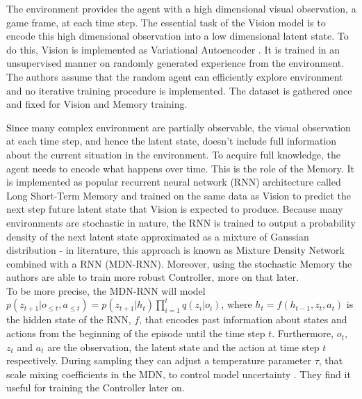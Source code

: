 The environment provides the agent with a high dimensional visual observation, a game frame, at each time step. The essential task of the Vision model is to encode this high dimensional observation into a low dimensional latent state. To do this, Vision is implemented as Variational Autoencoder \cite{Algo.VAE}. It is trained in an unsupervised manner on randomly generated experience from the environment. The authors assume that the random agent can efficiently explore environment and no iterative training procedure is implemented. The dataset is gathered once and fixed for Vision and Memory training.

Since many complex environment are partially observable, the visual observation at each time step, and hence the latent state, doesn't include full information about the current situation in the environment. To acquire full knowledge, the agent needs to encode what happens over time. This is the role of the Memory. It is implemented as popular recurrent neural network (RNN) architecture called Long Short-Term Memory \cite{Algo.LSTM} and trained on the same data as Vision to predict the next step future latent state that Vision is expected to produce. Because many environments are stochastic in nature, the RNN is trained to output a probability density of the next latent state approximated as a mixture of Gaussian distribution - in literature, this approach is known as Mixture Density Network combined with a RNN \cite{Algo.MDNRNN} (MDN-RNN). Moreover, using the stochastic Memory the authors are able to train more robust Controller, more on that later. \\
To be more precise, the MDN-RNN will model $p(z_{t+1} | o_{\leqslant t}, a_{\leqslant t}) = p(z_{t+1} | h_t) \prod_{i=1}^t q(z_i | o_i)$, where $h_t = f(h_{t-1}, z_t, a_t)$ is the hidden state of the RNN, $f$, that encodes past information about states and actions from the beginning of the episode until the time step $t$. Furthermore, $o_{t}$, $z_{t}$ and $a_{t}$ are the observation, the latent state and the action at time step $t$ respectively. During sampling they can adjust a temperature parameter $\tau$, that scale mixing coefficients in the MDN, to control model uncertainty \cite{Algo.Sketch-RNN}. They find it useful for training the Controller later on.

